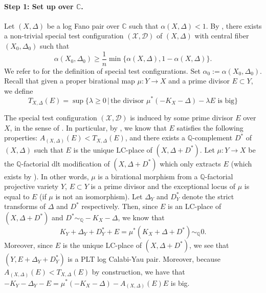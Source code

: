 \documentclass[11pt,reqno]{amsart}
\newcommand{\C}{\mathbb{C}}
\newcommand{\Q}{\mathbb{Q}}
\newcommand{\cD}{\mathcal{D}}
\newcommand{\cX}{\mathcal{X}}
\newcommand{\bC}{\mathbb{C}}
\newcommand{\bQ}{\mathbb{Q}}
\numberwithin{equation}{section}
\theoremstyle{definition}
\begin{document}
\paragraph{\textbf{Step 1: Set up over $\C$.}} Let $(X, \Delta)$ be a log Fano pair over $\bC$ such that $\alpha(X, \Delta)<1$. By \cite[Lemma~6.1]{LiuMoragaSussboundedness23}, there exists a non-trivial special test configuration $(\cX, \cD)$ of $(X, \Delta)$ with central fiber $(X_0, \Delta_0)$ such that 
\begin{equation} \label{eqn:alpha0bound}
\alpha(X_0, \Delta_0)\geq \frac{1}{n}\min\{\alpha(X, \Delta), 1-\alpha(X, \Delta)\}.
\end{equation}
We refer to \cite[Definition~2.27]{XuKstabilitybook} for the definition of special test configurations.
Set $\alpha_0:=\alpha(X_0, \Delta_0)$. Recall that given a proper birational map $\mu: Y \to X$ and a prime divisor $E \subset Y$, we define \[ T_{X, \Delta} (E) = \sup \{ \lambda \geq 0 \, | \, \text{the divisor } \mu^* (-K_X - \Delta) - \lambda E \text{ is big} \} \]

The special test configuration $(\cX, \cD)$ is induced by some prime divisor  $E$ over $X$, in the sense of \cite[Definition~4.21]{XuKstabilitybook}. In particular, by \cite[Theorem 4.27]{XuKstabilitybook}, we know that $E$ satisfies the following properties: 
$A_{(X, \Delta)} (E)< T_{X, \Delta}(E)$,
and there exists a $\bQ$-complement $D^*$ of $(X, \Delta)$ such that $E$ is the unique LC-place of $(X,\Delta+D^*)$. Let $\mu:Y\to X$ be the $\Q$-factorial dlt modification of $(X,\Delta + D^*)$ which only extracts $E$ (which exists by \cite[Corollary 1.4.3]{BCHM}). In other words, $\mu$ is a birational morphism from a $\Q$-factorial projective variety $Y$, $E \subset Y$ is a prime divisor and the exceptional locus of $\mu$ is equal to $E$ (if $\mu$ is not an isomorphism). Let $\Delta_Y$ and $D_Y ^*$ denote the strict transforms of $\Delta$ and $D^*$ respectively. 
Then, since $E$ is an LC-place of $(X, \Delta+D^*)$ and $D^* \sim _\Q  -K_X - \Delta$, we know that
\begin{equation} \label{YDElcy} K_Y + \Delta_Y+ D^* _Y + E = \mu ^* (K_X + \Delta +  D^*) \sim _{\Q} 0.   \end{equation}
Moreover, since $E$ is the unique LC-place of $(X, \Delta+ D^*)$, we see that $(Y, E+ \Delta_Y + D_Y^*)$ is a PLT log Calabi-Yau pair. Moreover, because $A_{(X, \Delta)}(E) < T_{X, \Delta} (E)$ by construction, we have that $-K_Y - \Delta_Y -E =\mu^*(-K_X - \Delta) - A_{(X, \Delta)}(E) E$ is big.  
\end{document}

